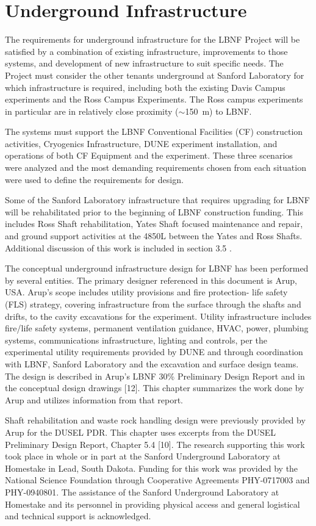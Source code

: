 \chapter{Underground Infrastructure}
\label{ch:fscf-und-infra}

The requirements for underground infrastructure for the LBNF Project will be satisfied by a combination of existing infrastructure, improvements to those systems, and development of new infrastructure to suit specific needs. The Project must consider the other tenants underground at Sanford Laboratory for which infrastructure is required, including both the existing Davis Campus experiments and the Ross Campus Experiments.  The Ross campus experiments in particular are in relatively close proximity ($\sim$150~m) to LBNF.

The systems must support the LBNF Conventional Facilities (CF) construction activities, Cryogenics Infrastructure, DUNE experiment installation, and operations of both CF Equipment and the experiment. These three scenarios were analyzed and the most demanding requirements chosen from each situation were used to define the requirements for design.

Some of the Sanford Laboratory infrastructure that requires upgrading for LBNF will be rehabilitated prior to the beginning of LBNF construction funding. This includes Ross Shaft rehabilitation, Yates Shaft focused maintenance and repair, and ground support activities at the 4850L between the Yates and Ross Shafts. Additional discussion of this work is included in section 3.5 .

The conceptual underground infrastructure design for LBNF has been performed by several entities. The primary designer referenced in this document is Arup, USA. Arup's scope includes utility provisions and fire protection- life safety (FLS) strategy, covering infrastructure from the surface through the shafts and drifts, to the cavity excavations for the experiment. Utility infrastructure includes fire/life safety systems, permanent ventilation guidance, HVAC, power, plumbing systems, communications infrastructure, lighting and controls, per the experimental utility requirements provided by DUNE and through coordination with LBNF, Sanford Laboratory and the excavation and surface design teams. The design is described in Arup's LBNF 30\% Preliminary Design Report and in the conceptual design drawings [12]. This chapter summarizes the work done by Arup and utilizes information from that report.

Shaft rehabilitation and waste rock handling design were previously provided by Arup for the DUSEL PDR. This chapter uses excerpts from the DUSEL Preliminary Design Report, Chapter 5.4 [10]. The research supporting this work took place in whole or in part at the Sanford Underground Laboratory at Homestake in Lead, South Dakota. Funding for this work was provided by the National Science Foundation through Cooperative Agreements PHY-0717003 and PHY-0940801. The assistance of the Sanford Underground Laboratory at Homestake and its personnel in providing physical access and general logistical and technical support is acknowledged.

